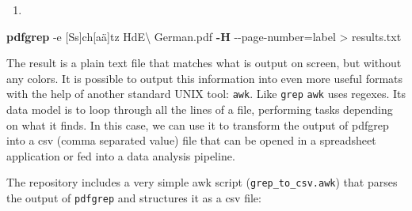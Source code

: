 \documentclass[
  letterpaper,
]{tufte-handout}
\newenvironment{Shaded}{\begin{snugshade}}{\end{snugshade}}
\newcommand{\AttributeTok}[1]{\textcolor[rgb]{0.00,0.34,0.68}{#1}}
\newcommand{\BuiltInTok}[1]{\textcolor[rgb]{0.39,0.29,0.61}{\textbf{#1}}}
\newcommand{\CommentTok}[1]{\textcolor[rgb]{0.54,0.53,0.53}{#1}}
\newcommand{\ControlFlowTok}[1]{\textcolor[rgb]{0.12,0.11,0.11}{\textbf{#1}}}
\newcommand{\DataTypeTok}[1]{\textcolor[rgb]{0.00,0.34,0.68}{#1}}
\newcommand{\DecValTok}[1]{\textcolor[rgb]{0.69,0.50,0.00}{#1}}
\newcommand{\ExtensionTok}[1]{\textcolor[rgb]{0.00,0.58,1.00}{\textbf{#1}}}
\newcommand{\FunctionTok}[1]{\textcolor[rgb]{0.39,0.29,0.61}{#1}}
\newcommand{\KeywordTok}[1]{\textcolor[rgb]{0.12,0.11,0.11}{\textbf{#1}}}
\newcommand{\NormalTok}[1]{\textcolor[rgb]{0.12,0.11,0.11}{#1}}
\newcommand{\OperatorTok}[1]{\textcolor[rgb]{0.12,0.11,0.11}{#1}}
\newcommand{\StringTok}[1]{\textcolor[rgb]{0.75,0.01,0.01}{#1}}
\providecommand{\tightlist}{%
  \setlength{\itemsep}{0pt}\setlength{\parskip}{0pt}}
\begin{document}
\begin{enumerate}
\def\labelenumi{(\arabic{enumi})}
\setcounter{enumi}{7}
\tightlist
\item
\end{enumerate}

\begin{Shaded}
\begin{Highlighting}[]
\ExtensionTok{pdfgrep} \AttributeTok{{-}e} \StringTok{\textquotesingle{}[Ss]ch[aä]tz\textquotesingle{}}\NormalTok{ HdE}\DataTypeTok{\textbackslash{} }\NormalTok{German.pdf }
\ExtensionTok{{-}H} \AttributeTok{{-}{-}page{-}number}\OperatorTok{=}\NormalTok{label }\OperatorTok{\textgreater{}}\NormalTok{ results.txt}
\end{Highlighting}
\end{Shaded}

The result is a plain text file that matches what is output on screen,
but without any colors. It is possible to output this information into
even more useful formats with the help of another standard UNIX tool:
\texttt{awk}. Like \texttt{grep} \texttt{awk} uses regexes. Its data
model is to loop through all the lines of a file, performing tasks
depending on what it finds. In this case, we can use it to transform the
output of pdfgrep into a csv (comma separated value) file that can be
opened in a spreadsheet application or fed into a data analysis
pipeline.

The repository includes a very simple awk script
(\texttt{grep\_to\_csv.awk}) that parses the output of \texttt{pdfgrep}
and structures it as a csv file:

\begin{Shaded}
\end{Shaded}
\end{document}
